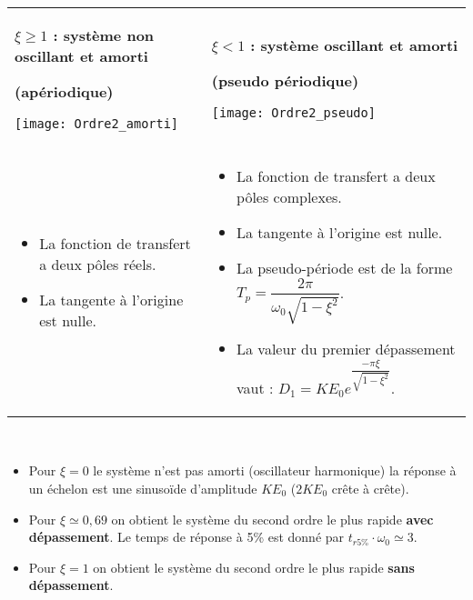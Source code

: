 \begin{resultat} ~\\

\vspace*{-1.3cm}

\noindent\begin{center}
\begin{tabular}{p{.4\linewidth}p{.58\linewidth}}
\begin{center}
\textbf{$\xi \geq 1$ : système non oscillant et amorti}

\textbf{(apériodique)}

\texttt{[image: Ordre2\_amorti]}
\end{center} 
& 
\begin{center}
\textbf{$\xi <1$ : système oscillant et amorti }

\textbf{(pseudo périodique)}

\texttt{[image: Ordre2\_pseudo]}
\end{center} 
\\
\vspace*{-1cm}
\begin{itemize} 
\item La fonction de transfert a deux pôles réels.
\item La tangente à l'origine est nulle.
\end{itemize}
& 
\vspace*{-.8cm}
\begin{itemize} 
\item La fonction de transfert a deux pôles complexes.
\item La tangente à l'origine est nulle.
\item La pseudo-période est de la forme $T_p=\dfrac{2\pi }{\omega_0 \sqrt{1-\xi^2}}$.
\item La valeur du premier dépassement vaut :  $D_1=KE_0e^{\dfrac{-\pi \xi }{\sqrt{1-\xi^2}}}$.
\end{itemize}
\end{tabular}
\end{center}
\end{resultat}

\begin{resultat} ~\\
\vspace{-.2cm}
\begin{itemize}
\item Pour $\xi=0$ le système n'est pas amorti (oscillateur harmonique) la réponse à un échelon est une sinusoïde d'amplitude $KE_0$ ($2KE_0$ crête à crête).  
\item Pour $\xi\simeq 0,69$  on obtient le système du second ordre le plus rapide \textbf{avec dépassement}. 
Le temps de réponse à 5\% est donné par $t_{r 5\%} \cdot \omega_0 \simeq 3$.
\item Pour $\xi =1$ on obtient le système du second ordre le plus rapide \textbf{sans dépassement}.

\end{itemize}
\end{resultat}

